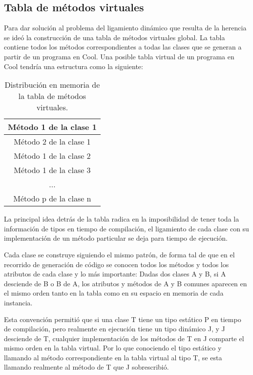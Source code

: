 \documentclass[a4paper,10pt,twocolumn]{article}
\begin{document}
\subsection{Tabla de métodos virtuales}

Para dar solución al problema del ligamiento dinámico que resulta de la herencia se ideó la construcción de una tabla de métodos virtuales global. La tabla contiene todos los métodos correspondientes a todas las clases que se generan a partir de un programa en Cool. Una posible tabla virtual de un programa en Cool tendría una estructura como la siguiente:

\newpage

\begin{table}[h]
	\centering
	\begin{tabular}{|c|}
		\hline
		Método 1 de la clase 1 \\
		\hline
		Método 2 de la clase 1 \\
		\hline
		Método 1 de la clase 2 \\
		\hline
		Método 1 de la clase 3  \\
		\hline
		...  \\
		\hline
		Método p de la clase n  \\
		\hline
	\end{tabular}
	\caption{Distribución en memoria de la tabla de métodos virtuales.}
	\label{fig:vtable}
	
\end{table}

La principal idea detrás de la tabla radica en la imposibilidad de tener toda la información de tipos en tiempo de compilación, el ligamiento de cada clase con su implementación de un método particular se deja para tiempo de ejecución.

Cada clase se construye siguiendo el mismo patrón, de forma tal de que en el recorrido de generación de código se conocen todos los métodos y todos los atributos de cada clase y lo más importante: Dadas dos clases A y B, si A desciende de B o B de A, los atributos y métodos de A y B comunes aparecen en el mismo orden tanto en la tabla como en su espacio en memoria de cada instancia. 

Esta convención permitió que si una clase T tiene un tipo estático P en tiempo de compilación, pero realmente en ejecución tiene un tipo dinámico J, y J desciende de T, cualquier implementación de los métodos de T en J comparte el mismo orden en la tabla virtual. Por lo que conociendo el tipo estático y llamando al método correspondiente en la tabla virtual al tipo T, se esta llamando realmente al método de T que J sobrescribió.

\label{end}
\end{document}
